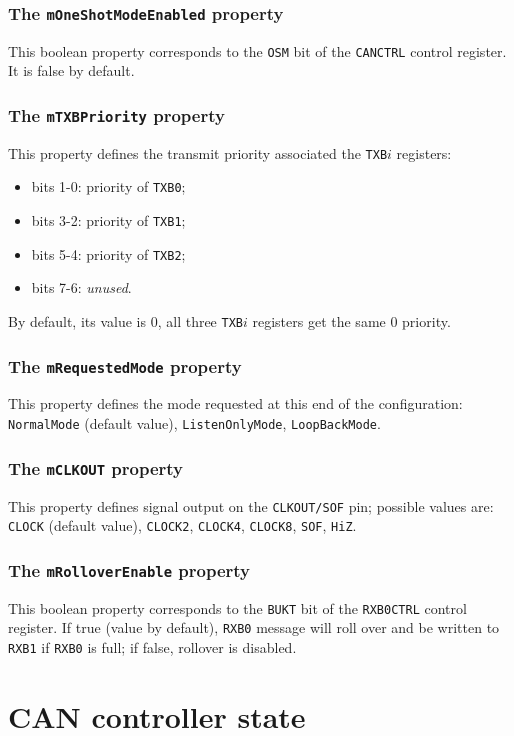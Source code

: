 \documentclass[10pt, a4paper, obeyspaces, openany]{extarticle}
\newcommand \sectionLabel[2]{\section{#1}\label{sec:#2}}
\newcommand \subsubsectionLabel[2]{\subsubsection{#1}\label{subsubsec:#2}}
\begin{document}
\subsubsectionLabel{The \texttt{mOneShotModeEnabled} property}{mOneShotModeEnabled}

This boolean property corresponds to the \texttt{OSM} bit of the \texttt{CANCTRL} control register. It is false by default.



\subsubsectionLabel{The \texttt{mTXBPriority} property}{mTXBPriority}

This property defines the transmit priority associated the \texttt{TXB$i$} registers:
\begin{itemize}
  \item bits 1-0: priority of \texttt{TXB0};
  \item bits 3-2: priority of \texttt{TXB1};
  \item bits 5-4: priority of \texttt{TXB2};
  \item bits 7-6: \emph{unused}.
\end{itemize}

By default, its value is $0$, all three \texttt{TXB$i$} registers get the same $0$ priority.



\subsubsectionLabel{The \texttt{mRequestedMode} property}{mRequestedMode}

This property defines the mode requested at this end of the configuration: \texttt{NormalMode} (default value), \texttt{ListenOnlyMode}, \texttt{LoopBackMode}.





\subsubsectionLabel{The \texttt{mCLKOUT} property}{mCLKOUT}

This property defines signal output on the \texttt{CLKOUT/SOF} pin; possible values are: \texttt{CLOCK} (default value), \texttt{CLOCK2}, \texttt{CLOCK4}, \texttt{CLOCK8}, \texttt{SOF}, \texttt{HiZ}.



\subsubsectionLabel{The \texttt{mRolloverEnable} property}{mRolloverEnable}

This boolean property corresponds to the \texttt{BUKT} bit of the \texttt{RXB0CTRL} control register. If true (value by default), \texttt{RXB0} message will roll over and be written to \texttt{RXB1} if \texttt{RXB0} is full; if false, rollover is disabled.











\sectionLabel{CAN controller state}{canControllerState}
\end{document}
